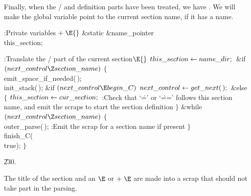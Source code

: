 Finally, when the \TEX/ and definition parts have been treated, we have
. We will make the global variable 
point to the current section name, if it has a name.

\Y\B\4:Private variables\X${}\mathrel+\E{}$\6
\&{static} \&{name\_pointer} \\{this\_section};\par
\fi

\B{}:Translate the \CEE/ part of the current section\X${}\E{}$\6
$\\{this\_section}\leftarrow\\{name\_dir};{}$\6
\&{if} ${}(\\{next\_control}\Z\\{section\_name}){}$\5
${}\{{}$\1\6
\\{emit\_space\_if\_needed}(\,);\6
\\{init\_stack}(\,);\6
\&{if} ${}(\\{next\_control}\E\\{begin\_C}){}$\1\5
${}\\{next\_control}\leftarrow\\{get\_next}(\,);{}$\2\6
\&{else}\5
${}\{{}$\1\6
${}\\{this\_section}\leftarrow\\{cur\_section};{}$\6
:Check that `\.{=}' or `\.{==}' follows this section name, and emit the
scraps to start the section definition\X\6
\4${}\}{}$\2\6
\&{while} ${}(\\{next\_control}\Z\\{section\_name}){}$\5
${}\{{}$\1\6
\\{outer\_parse}(\,);\6
:Emit the scrap for a section name if present\X\6
\4${}\}{}$\2\6
\\{finish\_C}(\\{true});\6
\4${}\}{}$\2\par
\U230.\fi

The title of the section and an $\E$ or $\mathrel+\E$ are made
into a scrap that should not take part in the parsing.

